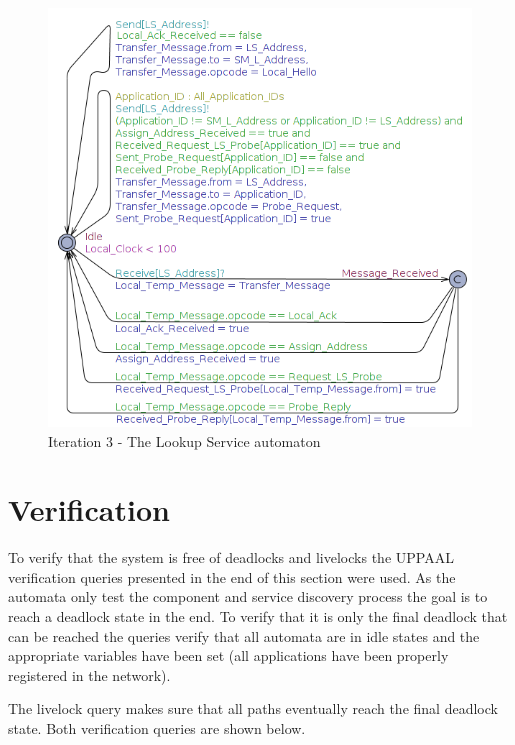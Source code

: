 \begin{figure}[ht]
    \centering
    \includegraphics[width=\textwidth]{figures/iteration3_ls}
    \caption{Iteration 3 - The Lookup Service automaton}
    \label{fig:iteration3_ls}
\end{figure}


\pagebreak
\section{Verification}
To verify that the system is free of deadlocks and livelocks the UPPAAL
verification queries presented in the end of this section were used. As the
automata only test the component and service discovery process the goal is to
reach a deadlock state in the end.  To verify that it is only the final
deadlock that can be reached the queries verify that all automata are in idle
states and the appropriate variables have been set (all applications have been
properly registered in the network).

The livelock query makes sure that all paths eventually reach the final deadlock
state. Both verification queries are shown below.

